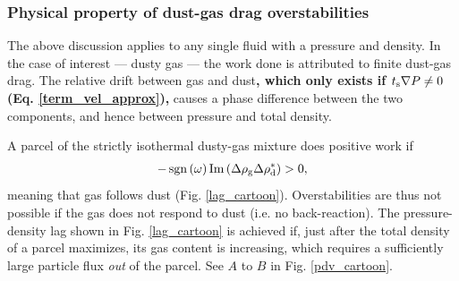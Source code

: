 \subsubsection{Physical property of dust-gas drag overstabilities}  




The above discussion applies to any single fluid with a pressure and
density. In the case of interest --- dusty gas --- the work done 
is attributed to finite dust-gas drag. 
The relative 
drift between gas and dust{\bf, which only exists if $t_\mathrm{s}\nabla P \neq 0$ (Eq. \ref{term_vel_approx}),} causes a phase difference between the two
components, and hence between pressure and total density. 

A parcel of the strictly isothermal dusty-gas mixture does 
positive work if  
\begin{align*}
-\operatorname{sgn}\left(\omega\right)\operatorname{Im}\left(\Delta\rho_\mathrm{g}\Delta\rho_\mathrm{d}^*\right)>0,
\end{align*}
meaning that gas follows dust (Fig. \ref{lag_cartoon}). Overstabilities 
are thus not possible if the gas does not respond to dust 
(i.e. no back-reaction).%
The pressure-density lag shown in
Fig. \ref{lag_cartoon} is achieved if, just after the total density of a 
parcel maximizes, its gas content
is increasing, which requires a sufficiently large
particle flux \emph{out} of the parcel. See $A$ to $B$ in 
Fig. \ref{pdv_cartoon}. 

